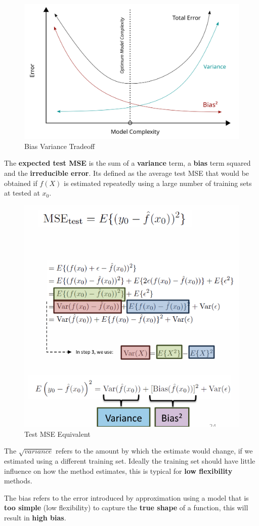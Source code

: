 \documentclass[../Main.tex]{subfiles}
\begin{document}
\begin{figure}[H]
    \centering
    \includegraphics[width=0.5\linewidth]{Images/Bias_and_variance_contributing_to_total_error.svg.png}
    \caption{Bias Variance Tradeoff}
\end{figure}
The \textbf{expected test MSE} is the sum of a \textbf{variance} term, a \textbf{bias} term squared and the \textbf{irreducible error}.  Its defined as the average test MSE that would be obtained if \(f(X)\) is estimated repeatedly using a large number of training sets at tested at \(x_0\).
\begin{figure}[H]
    \centering
    \includegraphics[width=0.5\linewidth]{Images/bias-variance-test-mse.png}
    \caption{Test MSE Equivalent}
\end{figure}

The \(\sqrt{variance}\) refers to the amount by which the estimate would change,
if we estimated using a different training set. 
Ideally the training set should have little influence on how the method estimates, this is typical for \textbf{low flexibility} methods.

The bias refers to the error introduced by approximation using a model that is \textbf{too simple} (low flexibility)
to capture the \textbf{true shape} of a function, this will result in \textbf{high bias}.
\end{document}
